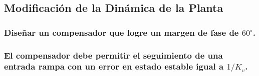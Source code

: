 \subsection{Modificación de la Dinámica de la Planta}
\subsubsection{Diseñar un compensador que logre un margen de fase de $60^\circ$.} 
\subsubsection{El compensador debe permitir el seguimiento de una entrada rampa con un error en estado estable igual a $1/K_v$.}
